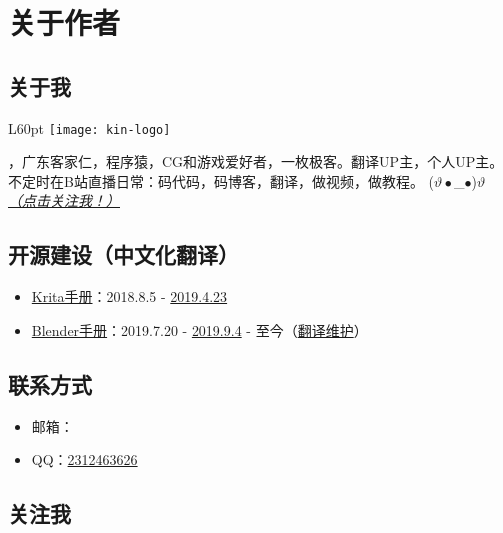 \chapter*{关于作者}

\section*{关于我}
\begin{wrapfigure}[3]{L}{60pt}
    \vspace*{-15pt}
    \centering
    \texttt{[image: kin-logo]}
\end{wrapfigure}
\textbf{\the\AuthorName}，广东客家仁，程序猿，CG和游戏爱好者，一枚极客。翻译UP主，个人UP主。不定时在B站直播日常：码代码，码博客，翻译，做视频，做教程。 ($\vartheta\bullet$\_$\bullet$)$\vartheta$ \hyperlink{follow}{\emph{（点击关注我！）}}

\section*{开源建设（中文化翻译）}
\begin{itemize}
    \item \href{https://docs.krita.org/zh_CN/}{Krita手册}：2018.8.5 - \href{https://crowdin.com/profile}{2019.4.23}
    \item \href{https://docs.blender.org/manual/zh-hans/latest/}{Blender手册}：2019.7.20 - \href{https://www.blendercn.org/5812.html?tdsourcetag=s_pctim_aiomsg}{2019.9.4} - 至今（\href{https://developer.blender.org/p/Mr_Kin/}{翻译维护}）
\end{itemize}

\section*{\hypertarget{contact}{联系方式}}

\begin{itemize}
    \item 邮箱：\href{mailto:\the\AuthorEmail}{\the\AuthorEmail}
    \item QQ：\href{tencent://AddContact/?fromId=45&fromSubId=1&subcmd=all&uin=2312463626&website=www.oicqzone.com}{2312463626}
\end{itemize}

\section*{\hypertarget{follow}{关注我}}

